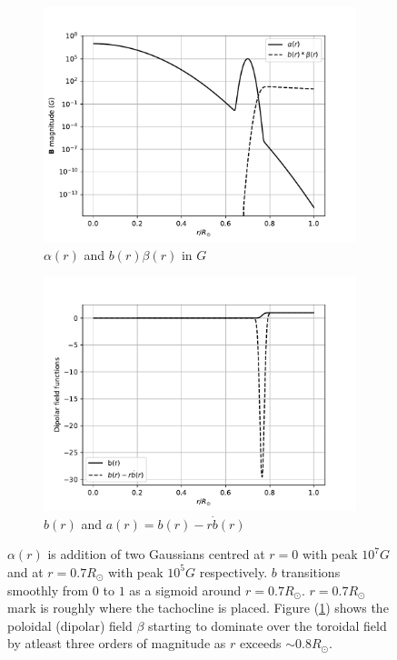 \begin{figure}[t]
\begin{subfigure}{0.5\linewidth}
\centering
\includegraphics[scale=.5]{Chapter3/figs/alpha_beta}
\caption{$\alpha(r)$ and $b(r) \beta(r)$ in $G$}
\label{fig:alpha_beta}
\end{subfigure}
\begin{subfigure}{0.5\linewidth}
\centering
\includegraphics[scale=0.5,center]{Chapter3/figs/b}
\caption{$b(r)$ and $a(r) = b(r)-r\dot{b}(r)$}
\label{fig:a_b}
\end{subfigure}
\caption{$\alpha(r)$ is addition of two Gaussians centred at $r=0$ with peak $10^7 G$ and at $r=0.7R_{\odot}$ with peak $10^5 G$ respectively. $b$ transitions smoothly from $0$ to $1$ as a sigmoid around $r=0.7R_{\odot}$. $r=0.7R_{\odot}$ mark is roughly where the tachocline is placed. Figure (\ref{fig:alpha_beta}) shows the poloidal (dipolar) field $\beta$ starting to dominate over the toroidal field by atleast three orders of magnitude as $r$ exceeds $\sim 0.8 R_{\odot}$.}
\end{figure}

